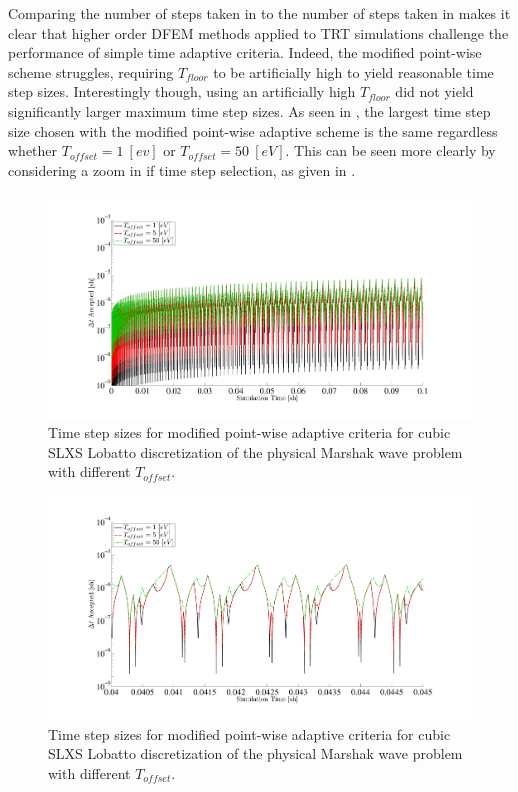 Comparing the number of steps taken in  to the number of steps taken in  makes it clear that higher order DFEM methods applied to TRT simulations challenge the performance of simple time adaptive criteria.
Indeed, the modified point-wise scheme struggles, requiring $T_{floor}$ to be artificially high to yield reasonable time step sizes.
Interestingly though, using an artificially high $T_{floor}$ did not yield significantly larger maximum time step sizes.  
As seen in , the largest time step size chosen with the modified point-wise adaptive scheme is the same regardless whether $T_{offset} = 1~[ev]$ or $T_{offset} = 50~[eV]$.
This can be seen more clearly by considering a zoom in if time step selection, as given in .
\begin{figure}[!htp]
\centering
\includegraphics[width=16cm,trim=2in  0.4in 0.5in 0.75in,clip=true]{chapter6_grey_radtran/Dissertation_Data/Modified_Pointwise_T_offset.pdf}
\caption{Time step sizes for modified point-wise adaptive criteria for cubic SLXS Lobatto discretization of the physical Marshak wave problem with different $T_{offset}$.}
\label{fig:mod_comparison}
\end{figure}
\begin{figure}[!hbp]
\centering
\includegraphics[width=16cm,trim=2in  0.4in 0.5in 0.75in,clip=true]{chapter6_grey_radtran/Dissertation_Data/Modified_Pointwise_T_offset_zoom.pdf}
\caption{Time step sizes for modified point-wise adaptive criteria for cubic SLXS Lobatto discretization of the physical Marshak wave problem with different $T_{offset}$.}
\label{fig:mod_comparison_zoom}
\end{figure}

